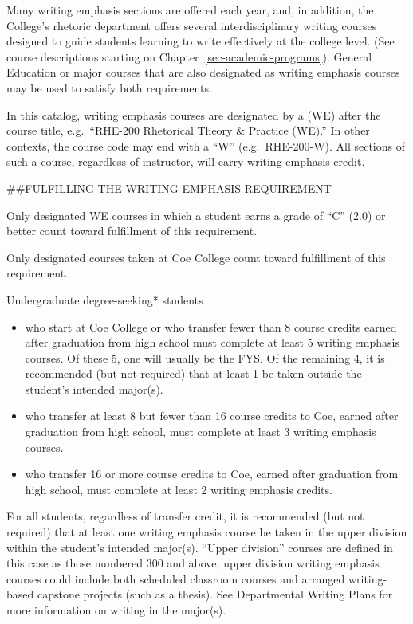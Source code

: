 \documentclass[
  letterpaper,
]{scrbook}
\begin{document}
Many writing emphasis sections are offered each year, and, in addition,
the College's rhetoric department offers several interdisciplinary
writing courses designed to guide students learning to write effectively
at the college level. (See course descriptions starting on
Chapter~\ref{sec-academic-programs}). General Education or major courses
that are also designated as writing emphasis courses may be used to
satisfy both requirements.

In this catalog, writing emphasis courses are designated by a (WE) after
the course title, e.g.~``RHE-200 Rhetorical Theory \& Practice (WE).''
In other contexts, the course code may end with a ``W''
(e.g.~RHE-200-W). All sections of such a course, regardless of
instructor, will carry writing emphasis credit.

\#\#FULFILLING THE WRITING EMPHASIS REQUIREMENT

Only designated WE courses in which a student earns a grade of ``C''
(2.0) or better count toward fulfillment of this requirement.

Only designated courses taken at Coe College count toward fulfillment of
this requirement.

Undergraduate degree-seeking* students

\begin{itemize}
\item
  who start at Coe College or who transfer fewer than 8 course credits
  earned after graduation from high school must complete at least 5
  writing emphasis courses. Of these 5, one will usually be the FYS. Of
  the remaining 4, it is recommended (but not required) that at least 1
  be taken outside the student's intended major(s).
\item
  who transfer at least 8 but fewer than 16 course credits to Coe,
  earned after graduation from high school, must complete at least 3
  writing emphasis courses.
\item
  who transfer 16 or more course credits to Coe, earned after graduation
  from high school, must complete at least 2 writing emphasis credits.
\end{itemize}

For all students, regardless of transfer credit, it is recommended (but
not required) that at least one writing emphasis course be taken in the
upper division within the student's intended major(s). ``Upper
division'' courses are defined in this case as those numbered 300 and
above; upper division writing emphasis courses could include both
scheduled classroom courses and arranged writing-based capstone projects
(such as a thesis). See Departmental Writing Plans for more information
on writing in the major(s).
\end{document}
